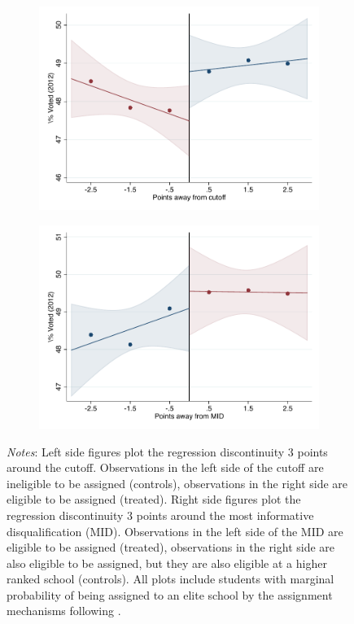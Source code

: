 \documentclass[oneside,11pt]{article}
\begin{document}
\begin{figure}[H]
\begin{center}
    \begin{subfigure}{0.475\textwidth}
        \centering
        \includegraphics[width=\textwidth]{04_Figures/rd_plot_tau_Voto_Marcado_2012_IPN3.pdf}
    \end{subfigure}
    \begin{subfigure}{0.475\textwidth}
        \centering
        \includegraphics[width=\textwidth]{04_Figures/rd_plot_mid_Voto_Marcado_2012_IPN3.pdf}
    \end{subfigure}
    \end{center}
    
\footnotesize
\textit{Notes}: Left side figures plot the regression discontinuity 3 points around the cutoff. Observations in the left side of the cutoff are ineligible to be assigned (controls), observations in the right side are eligible to be assigned (treated). Right side figures plot the regression discontinuity 3 points around the most informative disqualification (MID). Observations in the left side of the MID are eligible to be assigned (treated), observations in the right side are also eligible to be assigned, but they are also eligible at a higher ranked school (controls). All plots include students with marginal probability of being assigned to an elite school by the assignment mechanisms following \citet{abdulkadirouglu2022breaking}. 
\end{figure}
\end{document}
